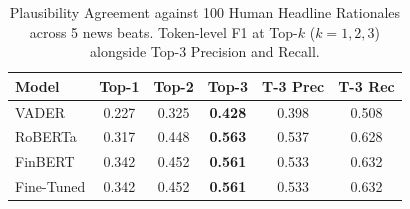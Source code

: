 \begin{table}[t]
\centering
\footnotesize
\setlength{\tabcolsep}{2.5pt}
\caption{Plausibility Agreement against 100 Human Headline Rationales across 5 news beats. Token-level F1 at Top-$k$ ($k=1, 2, 3$) alongside Top-3 Precision and Recall.}
\label{tab:plausibility}
\begin{tabular}{lccccc}
\toprule
\textbf{Model} & \textbf{Top-1} & \textbf{Top-2} & \textbf{Top-3} & \textbf{T-3 Prec} & \textbf{T-3 Rec} \\
\midrule
VADER & 0.227 & 0.325 & \textbf{0.428} & 0.398 & 0.508 \\
RoBERTa & 0.317 & 0.448 & \textbf{0.563} & 0.537 & 0.628 \\
FinBERT & 0.342 & 0.452 & \textbf{0.561} & 0.533 & 0.632 \\
Fine-Tuned & 0.342 & 0.452 & \textbf{0.561} & 0.533 & 0.632 \\
\bottomrule
\end{tabular}
\end{table}